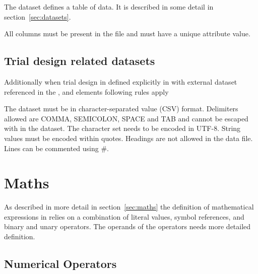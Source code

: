 The dataset defines a table of data. It is described in some detail in
section~\ref{sec:datasets}.

\begin{valrules}
 All columns must be present in the file and 
must have a unique  attribute value.
\end{valrules}

\subsection{Trial design related datasets}
Additionally when trial design in defined explicitly in \pml with external dataset 
referenced in the ,  and 
 elements following rules apply
\begin{valrules}
 The dataset must be in character-separated value 
(CSV) format.
 Delimiters allowed are COMMA, SEMICOLON, SPACE 
and TAB and cannot be escaped with in the dataset.
 The character set needs to be encoded in UTF-8.
 String values must be encoded within quotes.
 Headings are not allowed in the data file.
 Lines can be commented using \#.
\end{valrules}


\section{Maths}
\label{sec:phmaths-defns}

As described in more detail in section~\ref{sec:maths} the definition
of mathematical expressions in \pharmml relies on a combination of
literal values, symbol references, and binary and unary
operators. The operands of the operators needs more detailed
definition.

\subsection{Numerical Operators}

